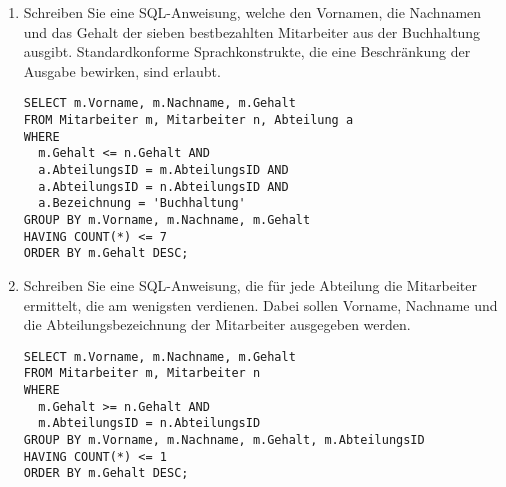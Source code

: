 \documentclass{lehramt-informatik-aufgabe}
\begin{document}
\begin{enumerate}

\item Schreiben Sie eine SQL-Anweisung, welche den Vornamen, die
Nachnamen und das Gehalt der sieben bestbezahlten Mitarbeiter aus der
Buchhaltung ausgibt. Standardkonforme Sprachkonstrukte, die eine
Beschränkung der Ausgabe bewirken, sind erlaubt.

\begin{liAntwort}
\begin{verbatim}
SELECT m.Vorname, m.Nachname, m.Gehalt
FROM Mitarbeiter m, Mitarbeiter n, Abteilung a
WHERE
  m.Gehalt <= n.Gehalt AND
  a.AbteilungsID = m.AbteilungsID AND
  a.AbteilungsID = n.AbteilungsID AND
  a.Bezeichnung = 'Buchhaltung'
GROUP BY m.Vorname, m.Nachname, m.Gehalt
HAVING COUNT(*) <= 7
ORDER BY m.Gehalt DESC;
\end{verbatim}
\end{liAntwort}


\item Schreiben Sie eine SQL-Anweisung, die für jede Abteilung die
Mitarbeiter ermittelt, die am wenigsten verdienen. Dabei sollen Vorname,
Nachname und die Abteilungsbezeichnung der Mitarbeiter ausgegeben
werden.

\begin{liAntwort}
\begin{verbatim}
SELECT m.Vorname, m.Nachname, m.Gehalt
FROM Mitarbeiter m, Mitarbeiter n
WHERE
  m.Gehalt >= n.Gehalt AND
  m.AbteilungsID = n.AbteilungsID
GROUP BY m.Vorname, m.Nachname, m.Gehalt, m.AbteilungsID
HAVING COUNT(*) <= 1
ORDER BY m.Gehalt DESC;
\end{verbatim}
\end{liAntwort}
\end{enumerate}
\end{document}
